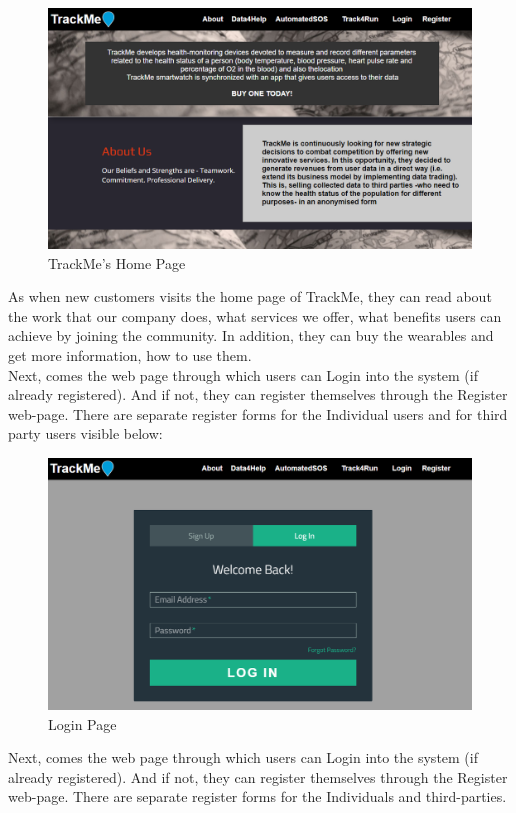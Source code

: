 \documentclass[a4paper, hidelinks, 12pt]{report}
\begin{document}
	\begin{figure}[H]
		\centering
		\includegraphics[width=1\textwidth]{../Assets/Home_Page.png}
		\caption[UI: TrackMe's Home Page]{TrackMe's Home Page}
		\label{fig:Home_Page}
	\end{figure}
	
	As when new customers visits the home page of TrackMe, they can read about the work that our company does, what services we offer, what benefits users can achieve by joining the community. In addition, they can buy the wearables and get more information, how to use them.\\

	Next, comes the web page through which users can Login into the system (if already registered). And if not, they can register themselves through the Register web-page. There are separate register forms for the Individual users and for third party users visible below:
	
	\begin{figure}[H]
		\centering
		\includegraphics[width=1\textwidth]{../Assets/Login.png}
		\caption[UI: Login Page]{Login Page}
		\label{fig:Login}
	\end{figure}
	Next, comes the web page through which users can Login into the system (if already registered). And if not, they can register themselves through the Register web-page. There are separate register forms for the Individuals and third-parties.
	
\end{document}
